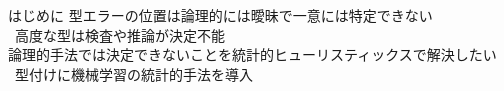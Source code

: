 \begin{block}{はじめに}
  \quad\Item 型エラーの位置は論理的には曖昧で一意には特定できない\\
  ~\Item 高度な型は検査や推論が決定不能\\
  \quad\Item 論理的手法では決定できないことを統計的ヒューリスティックスで解決したい\\
  ~\Item 型付けに機械学習の統計的手法を導入
\end{block}